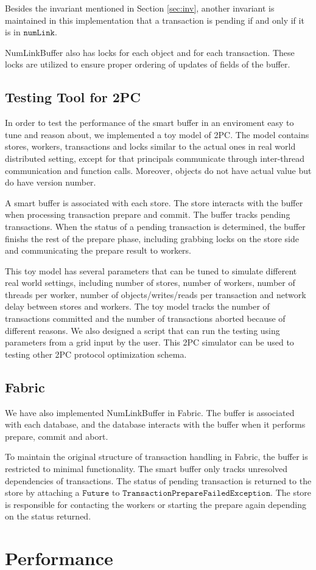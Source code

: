 \documentclass{article}
\begin{document}
Besides the invariant mentioned in Section \ref{sec:inv}, another invariant is 
maintained in this implementation that a transaction is pending if and only if 
it is in $\mathtt{numLink}$.

NumLinkBuffer also has locks for each object and for each transaction. These locks are
utilized to ensure proper ordering of updates of fields of the buffer.



\subsection{Testing Tool for 2PC}
In order to test the performance of the smart buffer in an enviroment easy to
tune and reason about, we implemented a toy model of 2PC. The model contains
stores, workers, transactions and locks similar to the actual ones in real world
distributed setting, except for that principals communicate through inter-thread
communication and function calls. Moreover, objects do not have actual value but
do have version number.

A smart buffer is associated with each store. The store interacts with the
buffer when processing transaction prepare and commit. The buffer tracks pending
transactions. When the status of a pending transaction is determined, the buffer
finishs the rest of the prepare phase, including grabbing locks on the store side
and communicating the prepare result to workers. 

This toy model has several parameters that can be tuned to simulate different
real world settings, including number of stores, number of workers, number of
threads per worker, number of objects/writes/reads per transaction and network
delay between stores and workers. The toy model tracks the number of
transactions committed and the number of transactions aborted because of
different reasons. We also designed a script that can run the testing using
parameters from a grid input by the user. This 2PC simulator can be used to
testing other 2PC protocol optimization schema.


\subsection{Fabric}
We have also implemented NumLinkBuffer in Fabric. The buffer is associated with
each database, and the database interacts with the buffer when it performs
prepare, commit and abort.

To maintain the original structure of transaction handling in Fabric, the buffer
is restricted to minimal functionality. The smart buffer only tracks unresolved
dependencies of transactions. The status of pending transaction is returned to
the store by attaching a $\mathtt{Future}$ to
$\mathtt{TransactionPrepareFailedException}$. The store is responsible for
contacting the workers or starting the prepare again depending on the status
returned.

\section{Performance}
\label{sec:performance}
\end{document}
